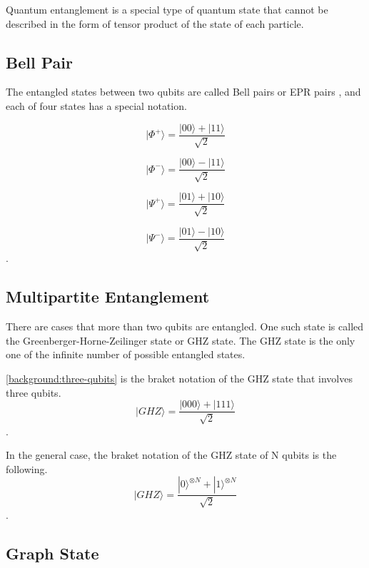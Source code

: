 Quantum entanglement is a special type of quantum state that cannot be described in the form of tensor product of the state of each particle.

\subsection{Bell Pair}
The entangled states between two qubits are called Bell pairs or EPR pairs \cite{PhysRev.47.777}, and each of four states has a special notation.

\begin{equation}
  |\Phi^+\rangle = \frac{|00\rangle + |11\rangle}{\sqrt{2}}
  \end{equation}
  
  \begin{equation}
 |\Phi^-\rangle = \frac{|00\rangle - |11\rangle}{\sqrt{2}}
 \end{equation}
 
 \begin{equation}
 |\Psi^+\rangle = \frac{|01\rangle + |10\rangle}{\sqrt{2}}
 \end{equation}
 
 \begin{equation}
  |\Psi^-\rangle = \frac{|01\rangle - |10\rangle}{\sqrt{2}}
  \end{equation}.

\subsection{Multipartite Entanglement}
There are cases that more than two qubits are entangled. One such state is called the Greenberger-Horne-Zeilinger state or GHZ state.
The GHZ state is the only one of the infinite number of possible entangled states.

\ref{background:three-qubits} is the braket notation of the GHZ state that involves three qubits.
\begin{equation}
  |GHZ\rangle = \frac{|000\rangle + |111\rangle}{\sqrt{2}}
  \label{background:three-qubits}
\end{equation}.

In the general case, the braket notation of the GHZ state of N qubits is the following.
\begin{equation}
  |GHZ\rangle = \frac{|0\rangle^{\otimes N} + |1\rangle^{\otimes N}}{\sqrt{2}}
\end{equation}.

\subsection{Graph State}

